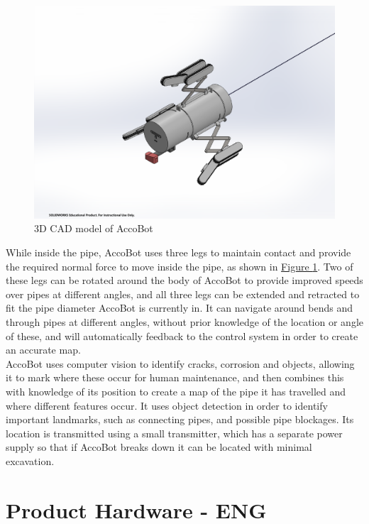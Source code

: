 \documentclass[11pt]{article}		%
\newlength{\imageheight}	 %
\newcommand{\figref}[1]{\hyperref[#1]{Figure \ref*{#1}}}    %
\begin{document}
		\begin{figure}[h] %
			\centering
			\includegraphics[trim={6cm 2cm 7cm 4cm},clip,height=\imageheight]{overviewCAD}
			\caption{3D CAD model of AccoBot}
			\label{3DSketch}
		\end{figure}
		
		While inside the pipe, AccoBot uses three legs to maintain contact and provide the required normal force to move inside the pipe, as shown in \figref{3DSketch}.
		Two of these legs can be rotated around the body of AccoBot to provide improved speeds over pipes at different angles, and all three legs can be extended and retracted to fit the pipe diameter AccoBot is currently in.
		It can navigate around bends and through pipes at different angles, without prior knowledge of the location or angle of these, and will automatically feedback to the control system in order to create an accurate map.
		\\
		AccoBot uses computer vision to identify cracks, corrosion and objects, allowing it to mark where these occur for human maintenance, and then combines this with knowledge of its position to create a map of the pipe it has travelled and where different features occur.
		It uses object detection in order to identify important landmarks, such as connecting pipes, and possible pipe blockages.
		Its location is transmitted using a small transmitter, which has a separate power supply so that if AccoBot breaks down it can be located with minimal excavation.
	
	\section{Product Hardware - ENG}
	
\end{document}
